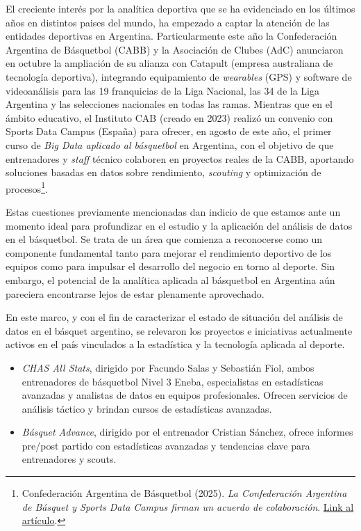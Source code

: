 \documentclass[
]{article}
\begin{document}
El creciente interés por la analítica deportiva que se ha evidenciado en
los últimos años en distintos paises del mundo, ha empezado a captar la
atención de las entidades deportivas en Argentina. Particularmente este
año la Confederación Argentina de Básquetbol (CABB) y la Asociación de
Clubes (AdC) anunciaron en octubre la ampliación de su alianza con
Catapult (empresa australiana de tecnología deportiva), integrando
equipamiento de \emph{wearables} (GPS) y software de videoanálisis para
las 19 franquicias de la Liga Nacional, las 34 de la Liga Argentina y
las selecciones nacionales en todas las ramas. Mientras que en el ámbito
educativo, el Instituto CAB (creado en 2023) realizó un convenio con
Sports Data Campus (España) para ofrecer, en agosto de este año, el
primer curso de \emph{Big Data aplicado al básquetbol} en Argentina, con
el objetivo de que entrenadores y \emph{staff} técnico colaboren en
proyectos reales de la CABB, aportando soluciones basadas en datos sobre
rendimiento, \emph{scouting} y optimización de procesos\footnote{Confederación
  Argentina de Básquetbol (2025). \emph{La Confederación Argentina de
  Básquet y Sports Data Campus firman un acuerdo de colaboración}.
  \href{https://www.argentina.basketball/ver/noticia/la-confederacion-argentina-de-basquet-y-sports-data-campus-firman-un-acuerdo-de-colaboracion}{Link
  al artículo}.}.

Estas cuestiones previamente mencionadas dan indicio de que estamos ante
un momento ideal para profundizar en el estudio y la aplicación del
análisis de datos en el básquetbol. Se trata de un área que comienza a
reconocerse como un componente fundamental tanto para mejorar el
rendimiento deportivo de los equipos como para impulsar el desarrollo
del negocio en torno al deporte. Sin embargo, el potencial de la
analítica aplicada al básquetbol en Argentina aún pareciera encontrarse
lejos de estar plenamente aprovechado.

En este marco, y con el fin de caracterizar el estado de situación del
análisis de datos en el básquet argentino, se relevaron los proyectos e
iniciativas actualmente activos en el país vinculados a la estadística y
la tecnología aplicada al deporte.

\begin{itemize}
\item
  \emph{CHAS All Stats}, dirigido por Facundo Salas y Sebastián Fiol,
  ambos entrenadores de básquetbol Nivel 3 Eneba, especialistas en
  estadísticas avanzadas y analistas de datos en equipos profesionales.
  Ofrecen servicios de análisis táctico y brindan cursos de estadísticas
  avanzadas.
\item
  \emph{Básquet Advance}, dirigido por el entrenador Cristian Sánchez,
  ofrece informes pre/post partido con estadísticas avanzadas y
  tendencias clave para entrenadores y scouts.
\end{itemize}
\end{document}
